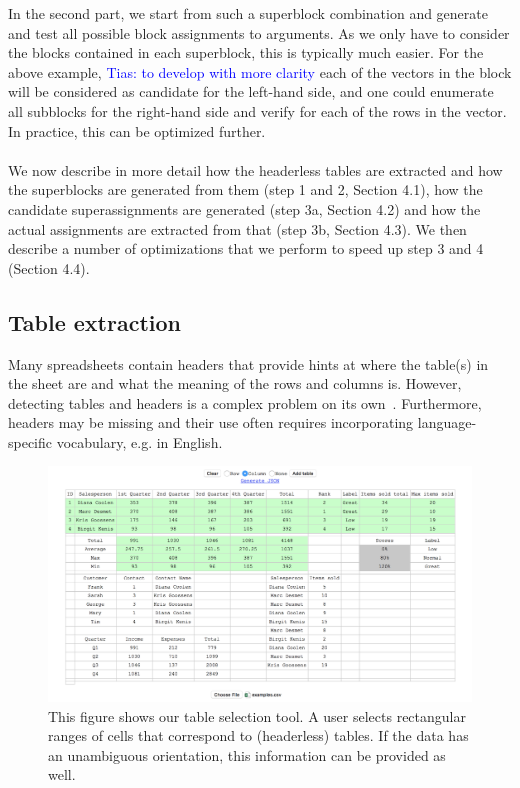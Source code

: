 \documentclass{IEEEtran}
\newcommand{\tias}[1]{\textcolor{blue}{{\sc Tias:} #1}\xspace}
\theoremstyle{definition}
\begin{document}
In the second part, we start from such a superblock combination and generate and test all possible block assignments to arguments. As we only have to consider the blocks contained in each superblock, this is typically much easier. For the above example, \tias{to develop with more clarity} each of the vectors in the block will be considered as candidate for the left-hand side, and one could enumerate all subblocks for the right-hand side and verify for each of the rows in the vector. In practice, this can be optimized further.
\\\\
We now describe in more detail how the headerless tables are extracted and how the superblocks are generated from them (step 1 and 2, Section 4.1), how the candidate superassignments are generated (step 3a, Section 4.2) and how the actual assignments are extracted from that (step 3b, Section 4.3). We then describe a number of optimizations that we perform to speed up step 3 and 4 (Section 4.4).

\subsection{Table extraction}
\label{sec:table_extraction}
Many spreadsheets contain headers that provide hints at where the table(s) in the sheet are and what the meaning of the rows and columns is. However, detecting tables and headers is a complex problem on its own~\cite{header}. Furthermore, headers may be missing and their use often requires incorporating language-specific vocabulary, e.g. in English.

\begin{figure}[t]
  \centering
  \includegraphics[width=1\linewidth]{figures/tabletool.png}
  \caption{This figure shows our table selection tool. A user selects rectangular ranges of cells that correspond to (headerless) tables. If the data has an unambiguous orientation, this information can be provided as well.}
  \label{fig:visual_tool}
\end{figure}
\end{document}
